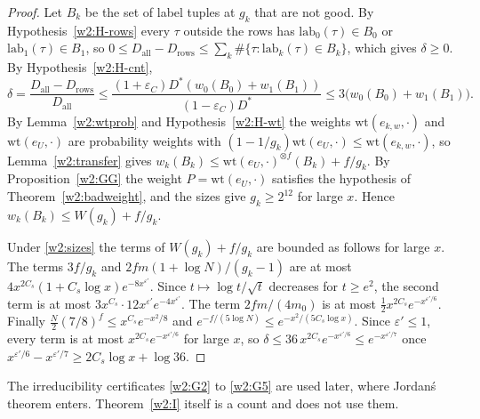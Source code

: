 \begin{proof}
Let $B_k$ be the set of label tuples at $g_k$ that are not good. By Hypothesis~\ref{w2:H-rows} every $\tau$ outside the rows has $\mathrm{lab}_0(\tau)\in B_0$ or $\mathrm{lab}_1(\tau)\in B_1$, so $0\le D_{\mathrm{all}}-D_{\mathrm{rows}}\le\sum_k\#\{\tau:\mathrm{lab}_k(\tau)\in B_k\}$, which gives $\delta\ge0$. By Hypothesis~\ref{w2:H-cnt},
\[
\delta=\frac{D_{\mathrm{all}}-D_{\mathrm{rows}}}{D_{\mathrm{all}}}\le\frac{(1+\varepsilon_C)D^*(w_0(B_0)+w_1(B_1))}{(1-\varepsilon_C)D^*}\le3\bigl(w_0(B_0)+w_1(B_1)\bigr).
\]
By Lemma~\ref{w2:wtprob} and Hypothesis~\ref{w2:H-wt} the weights $\mathrm{wt}(e_{k,w},\cdot)$ and $\mathrm{wt}(e_U,\cdot)$ are probability weights with $(1-1/g_k)\mathrm{wt}(e_U,\cdot)\le\mathrm{wt}(e_{k,w},\cdot)$, so Lemma~\ref{w2:transfer} gives $w_k(B_k)\le\mathrm{wt}(e_U,\cdot)^{\otimes f}(B_k)+f/g_k$. By Proposition~\ref{w2:GG} the weight $P=\mathrm{wt}(e_U,\cdot)$ satisfies the hypothesis of Theorem~\ref{w2:badweight}, and the sizes give $g_k\ge2^{12}$ for large $x$. Hence $w_k(B_k)\le W(g_k)+f/g_k$.

Under \eqref{w2:sizes} the terms of $W(g_k)+f/g_k$ are bounded as follows for large $x$. The terms $3f/g_k$ and $2fm(1+\log N)/(g_k-1)$ are at most $4x^{2C_s}(1+C_s\log x)e^{-8x^{\varepsilon'}}$. Since $t\mapsto\log t/\sqrt t$ decreases for $t\ge e^2$, the second term is at most $3x^{C_s}\cdot12x^{\varepsilon'}e^{-4x^{\varepsilon'}}$. The term $2fm/(4m_0)$ is at most $\tfrac12x^{2C_s}e^{-x^{\varepsilon'/6}}$. Finally $\tfrac N2(7/8)^f\le x^{C_s}e^{-x^2/8}$ and $e^{-f/(5\log N)}\le e^{-x^2/(5C_s\log x)}$. Since $\varepsilon'\le1$, every term is at most $x^{2C_s}e^{-x^{\varepsilon'/6}}$ for large $x$, so $\delta\le36\,x^{2C_s}e^{-x^{\varepsilon'/6}}\le e^{-x^{\varepsilon'/7}}$ once $x^{\varepsilon'/6}-x^{\varepsilon'/7}\ge2C_s\log x+\log36$.
\end{proof}

\begin{remark}\label{w2:rem:irr}
The irreducibility certificates \ref{w2:G2} to \ref{w2:G5} are used later, where Jordan\'s theorem enters. Theorem~\ref{w2:I} itself is a count and does not use them.
\end{remark}

